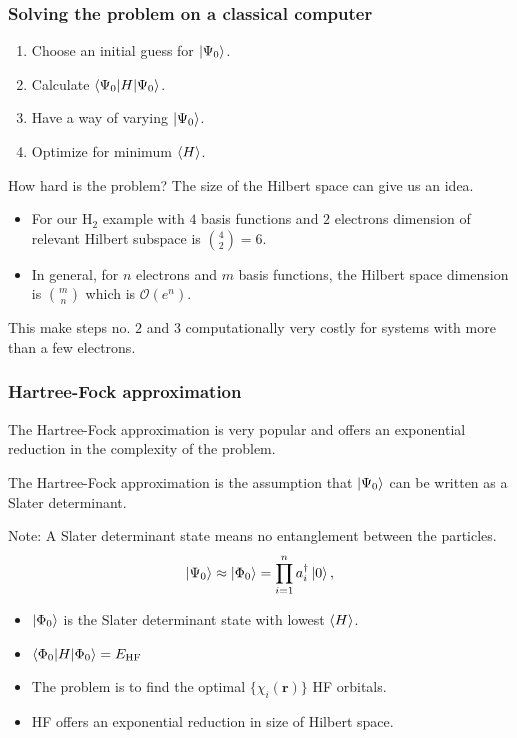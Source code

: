 \documentclass{beamer}
\newcommand{\mc}{\mathcal}
\renewcommand{\(}{\left(}
\renewcommand{\)}{\right)}
\renewcommand{\[}{\left[}
\renewcommand{\]}{\right]}
\begin{document}
\begin{frame}
    \frametitle{Solving the problem on a classical computer}
    \begin{enumerate}
        \item Choose an initial guess for $\ket{\Psi_0}$.
        \item Calculate $\braket{\Psi_0|H|\Psi_0}$.
        \item Have a way of varying $\ket{\Psi_0}$.  
        \item Optimize for minimum $\braket{H}$. 
    \end{enumerate}
    \pause
    How hard is the problem? The size of the Hilbert space can give us an idea. 
    \begin{itemize}
        \item For our $\text{H}_2$ example with $4$ basis functions and $2$ electrons dimension of relevant Hilbert subspace is $\binom{4}{2} = 6$.
        \item In general, for $n$ electrons and $m$ basis functions, the Hilbert space dimension is $\binom{m}{n} $ which is $\mc O(e^n)$.
    \end{itemize}
    
    This make steps no. $2$ and $3$ computationally very costly for systems with more than a few electrons. 
\end{frame}


\begin{frame}
    \frametitle{Hartree-Fock approximation}
    The Hartree-Fock approximation is very popular and offers an exponential reduction in the complexity of the problem. 
     
    \begin{framed}
        The Hartree-Fock approximation is the assumption that $\ket{\Psi_0}$ can be written as a Slater determinant.
    \end{framed}
    Note: A Slater determinant state means no entanglement between the particles. 
    \begin{align*}
        \ket{\Psi_0} \approx \ket{\Phi_0} = \prod_{i=1}^n a^{\dagger}_i \ket{0},
    \end{align*}
    \pause
    \begin{itemize}
        \item $\ket{\Phi_0}$ is the Slater determinant state with lowest $\braket{H}$.
        \item $\braket{\Phi_0|H|\Phi_0} = E_{\text{HF}}$
        \item The problem is to find the optimal $\{\chi_i(\bm r)\}$ HF orbitals.
        \item HF offers an exponential reduction in size of Hilbert space.

    \end{itemize}
\end{frame}
\end{document}
